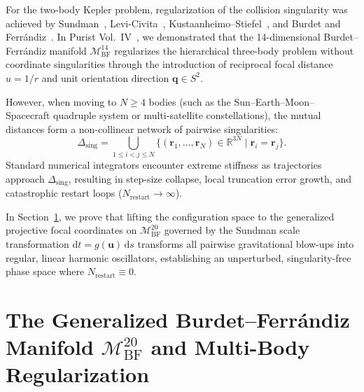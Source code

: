 \documentclass[11pt,a4paper,reqno]{article}
\theoremstyle{plain}
\theoremstyle{definition}
\theoremstyle{remark}
\numberwithin{equation}{section}
\newcommand{\MbfTwenty}{\mathcal{M}_{\mathrm{BF}}^{20}}
\newcommand{\MbfFourteen}{\mathcal{M}_{\mathrm{BF}}^{14}}
\providecommand{\diff}{\mathrm{d}}
\begin{document}
For the two-body Kepler problem, regularization of the collision singularity was achieved by Sundman~\cite{sundman1912}, Levi-Civita~\cite{levicivita1920}, Kustaanheimo--Stiefel~\cite{kustaanheimo1965}, and Burdet and Ferr\'{a}ndiz~\cite{burdet1969, ferrandiz1988}. In Purist Vol.~IV~\cite{RelativisticThreeBody2026}, we demonstrated that the 14-dimensional Burdet--Ferr\'{a}ndiz manifold $\MbfFourteen$ regularizes the hierarchical three-body problem without coordinate singularities through the introduction of reciprocal focal distance $u = 1/r$ and unit orientation direction $\bm{q} \in S^2$.

However, when moving to $N \ge 4$ bodies (such as the Sun--Earth--Moon--Spacecraft quadruple system or multi-satellite constellations), the mutual distances form a non-collinear network of pairwise singularities:
\begin{equation}
  \Delta_{\mathrm{sing}} = \bigcup_{1 \le i < j \le N} \{ (\bm{r}_1, \dots, \bm{r}_N) \in \mathbb{R}^{3N} \mid \bm{r}_i = \bm{r}_j \}.
  \label{eq:singularity_set}
\end{equation}
Standard numerical integrators encounter extreme stiffness as trajectories approach $\Delta_{\mathrm{sing}}$, resulting in step-size collapse, local truncation error growth, and catastrophic restart loops ($N_{\mathrm{restart}} \to \infty$).

In Section~\ref{sec:projective_regularization_mbf20}, we prove that lifting the configuration space to the generalized projective focal coordinates on $\MbfTwenty$ governed by the Sundman scale transformation $\diff t = g(\bm{u})\,\diff s$ transforms all pairwise gravitational blow-ups into regular, linear harmonic oscillators, establishing an unperturbed, singularity-free phase space where $N_{\mathrm{restart}} \equiv 0$.

\section{The Generalized Burdet--Ferr\'andiz Manifold \texorpdfstring{$\MbfTwenty$}{M BF(20)} and Multi-Body Regularization}
\label{sec:projective_regularization_mbf20}
\end{document}
